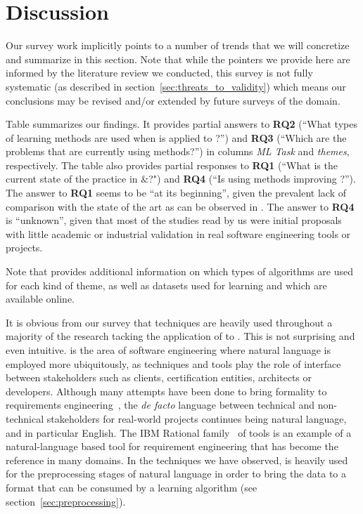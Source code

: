 \section{Discussion}
\label{sec:discussion}
Our survey work implicitly points to a number of trends that we will
concretize and summarize in this section. Note that while the pointers we
provide here are informed by the literature review we conducted, this survey is
not fully systematic (as described in section~\ref{sec:threats_to_validity}) which
means our conclusions may be revised and/or extended by future surveys of the
domain.

Table  summarizes our findings. It provides partial answers to
\textbf{RQ2} (``What types of learning methods are used when \ML is applied to
\RE?'') and \textbf{RQ3} (``Which are the \RE problems that are currently using
\ML methods?'') in columns \emph{ML Task} and  \emph{themes}, respectively.
The table also provides partial responses to \textbf{RQ1} (``What is the current
state of the practice in \ML${\&}$\RE?") and \textbf{RQ4} (``Is using \ML
methods improving \RE?''). The answer to \textbf{RQ1} seems to be ``at its
beginning'', given the prevalent lack of comparison with the state of the art
as can be observed in . The answer to \textbf{RQ4} is
``unknown'', given that most of the studies read by us were initial proposals
with little academic or industrial validation in real software engineering tools or projects.

Note that  provides additional information on which types of
algorithms are used for each kind of theme, as well as datasets used for
learning and which are available online.

It is obvious from our survey that \NLP techniques are heavily used
throughout a majority of the research tacking the application of \ML to
\RE. This is not surprising and even intuitive. \RE is the area of software
engineering where natural language is employed more ubiquitously, as \RE
techniques and tools play the role of interface between stakeholders such as
clients, certification entities, architects or developers. Although many
attempts have been done to bring formality to requirements
engineering~\cite{Teufl17,LucioRCA16}, the \emph{de facto} language between
technical and non-technical stakeholders for real-world projects continues being
natural language, and in particular English.
The IBM Rational \DOORS family~\cite{doors} of tools is an example
of a natural-language based tool for requirement engineering that has become the
reference in many domains. In the techniques we have observed, \NLP is heavily
used for the preprocessing stages of natural language in order to bring the data to a format
that can be consumed by a learning algorithm (see
section~\ref{sec:preprocessing}).
 
